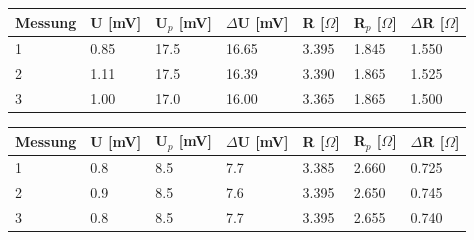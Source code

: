 \begin{minipage}{\linewidth}
    \begin{table}[H]
        \centering
    \begin{tabular}{lllllll}
        \toprule
        Messung & U [mV] & U$_p$ [mV] & $\Delta$U [mV] & R [$\Omega$] & R$_p$ [$\Omega$] & $\Delta$R [$\Omega$] \\
        \midrule
        1 & 0.85 & 17.5 & 16.65 & 3.395 & 1.845 & 1.550 \\
        2 & 1.11 & 17.5 & 16.39 & 3.390 & 1.865 & 1.525 \\
        3 & 1.00 & 17.0 & 16.00 & 3.365 & 1.865 & 1.500 \\
        \bottomrule   
    \end{tabular}
    
    \label{tab:2}
\end{table}
\end{minipage}

\begin{minipage}{\linewidth}
    \begin{table}[H]
        \centering
    \begin{tabular}{lllllll}
        \toprule
        Messung & U [mV] & U$_p$ [mV] & $\Delta$U [mV] & R [$\Omega$] & R$_p$ [$\Omega$] & $\Delta$R [$\Omega$] \\
        \midrule
        1 & 0.8 & 8.5 & 7.7 & 3.385 & 2.660 & 0.725 \\
        2 & 0.9 & 8.5 & 7.6 & 3.395 & 2.650 & 0.745 \\
        3 & 0.8 & 8.5 & 7.7 & 3.395 & 2.655 & 0.740 \\
        \bottomrule   
    \end{tabular}
    
    \label{tab:Ga}
\end{table}
\end{minipage}
